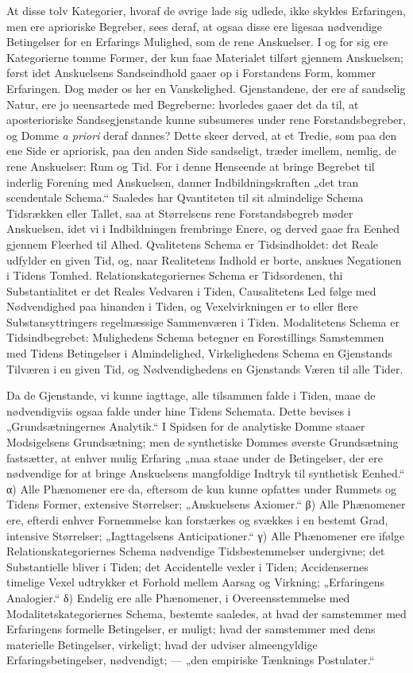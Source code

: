 \documentclass[12pt]{book}
\newcommand{\opage}[1]{\marginnote{\footnotesize\textit{[#1]}}}
\begin{document}
At disse tolv Kategorier, hvoraf de øvrige lade sig udlede, ikke skyldes
Erfaringen, men ere aprioriske Begreber, sees deraf, at ogsaa disse ere ligesaa
nødvendige Betingelser for en Erfarings Mulighed, som de rene Anskuelser. I og for
sig ere Kategorierne tomme Former, der kun faae Materialet tilført gjennem
Anskuelsen; først idet Anskuelsens Sandseindhold gaaer op i Forstandens Form,
kommer Erfaringen. Dog møder os her en Vanskelighed. Gjenstandene, der ere af
sandselig Natur, ere jo ueensartede med Begreberne: hvorledes gaaer det da til, at
aposterioriske Sandsegjenstande kunne subsumeres under rene Forstandsbegreber, og
Domme \textit{a priori} deraf dannes? Dette skeer derved, at et Tredie, som paa den
ene Side er apriorisk, paa den anden Side sandseligt, træder imellem, nemlig, de
rene Anskuelser: Rum og Tid. For i denne Henseende at bringe Begrebet til inderlig
Forening med Anskuelsen, danner Indbildningskraften „det tran%
\opage{26}scendentale Schema.“ Saaledes har Qvantiteten til sit almindelige Schema Tidsrækken
eller Tallet, saa at Størrelsens rene Forstandsbegreb møder Anskuelsen, idet vi i
Indbildningen frembringe Enere, og derved gaae fra Eenhed gjennem Fleerhed til
Alhed. Qvalitetens Schema er Tidsindholdet: det Reale udfylder en given Tid, og,
naar Realitetens Indhold er borte, anskues Negationen i Tidens Tomhed.
Relationskategoriernes Schema er Tidsordenen, thi Substantialitet er det Reales
Vedvaren i Tiden, Causalitetens Led følge med Nødvendighed paa hinanden i Tiden, og
Vexelvirkningen er to eller flere Substansyttringers regelmæssige Sammenværen i
Tiden. Modalitetens Schema er Tidsindbegrebet: Mulighedens Schema betegner en
Forestillings Samstemmen med Tidens Betingelser i Almindelighed, Virkelighedens
Schema en Gjenstands Tilværen i en given Tid, og Nødvendighedens en Gjenstands Væren
til alle Tider.

Da de Gjenstande, vi kunne iagttage, alle tilsammen falde i Tiden, maae de
nødvendigviis ogsaa falde under hine Tidens Schemata. Dette bevises i
„Grundsætningernes Analytik.“ I Spidsen for de analytiske Domme staaer Modsigelsens
Grundsætning; men de synthetiske Dommes øverste Grundsætning fastsætter, at enhver
mulig Erfaring „maa staae under de Betingelser, der ere nødvendige for at bringe
Anskuelsens mangfoldige Indtryk til synthetisk Eenhed.“ α) Alle Phænomener ere da,
eftersom de kun kunne opfattes under Rummets og Tidens Former, extensive
Størrelser; „Anskuelsens Axiomer.“ β) Alle Phænomener ere, efterdi enhver
Fornemmelse kan forstærkes og svækkes i en bestemt Grad, intensive Størrelser;
„Iagttagelsens Anticipationer.“ γ) Alle Phænomener ere ifølge
Relationskategoriernes Schema nødvendige Tidsbestemmelser undergivne; det
Substantielle bliver i Tiden; det Accidentelle vexler i Tiden; Accidensernes
timelige Vexel udtrykker et Forhold mellem Aarsag og Virkning; „Erfaringens
Analogier.“ δ) Endelig ere alle Phænomener, i Overeensstemmelse med
Modalitetskategoriernes
\opage{27} Schema, bestemte saaledes, at hvad der samstemmer med Erfaringens formelle
Betingelser, er muligt; hvad der samstemmer med dens materielle Betingelser,
virkeligt; hvad der udviser almeengyldige Erfaringsbetingelser, nødvendigt; ---
„den empiriske Tænknings Postulater.“
\end{document}
